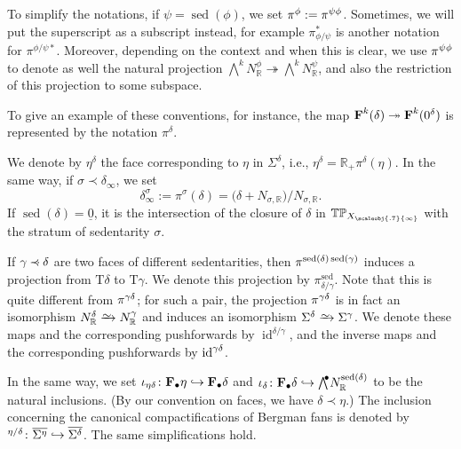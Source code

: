 \documentclass[11pt]{amsart}
\theoremstyle{definition}
\numberwithin{equation}{section}
\newcommand{\ie}{i.e.}
\renewcommand{\~}{\widetilde}
\newcommand{\R}{\mathbb{R}}
\newcommand{\simto}{\xrightarrow{\raisebox{-3pt}[0pt][0pt]{\small$\hspace{-1pt}\sim$}}}
\newcommand{\bul}{\bullet} %
\newcommand{\rquot}[2]{#1\big/#2}
\let\oldbigwedge\bigwedge
\renewcommand{\bigwedge}{{\textstyle\oldbigwedge\!}}
\DeclareMathOperator{\sed}{sed} %
\DeclareMathOperator{\id}{id} %
\newcommand{\TP}{\mathbb{TP}} %
\newcommand{\TT}{\mathrm{T}} %
\let\i\relax
\newcommand{\i}{{\mathop{}\mathrm{i}}} %
\newcommand{\SF}{\textrm{\bf F}} %
\newcommand{\comp}[1]{\overline{#1}} %
\newcommand{\sminfty}{{\scaleobj{.7}{\infty}}} %
\newcommand{\conezero}{{\underline0}} %
\newcommand{\subface}{\prec}
\newcommand{\ssubface}{\mathbin{\mathchoice
  {\subface\!\!\!\cdot}%
  {\subface\!\!\!\cdot}%
  {\subface\!\cdot}%
  {\subface\!\cdot}%
}} %
\begin{document}
{\medskip

To simplify the notations, if $\psi=\sed(\phi)$, we set $\pi^\phi:=\pi^{\psi\/\phi}$.
Sometimes, we will put the superscript as a subscript instead, for example $\pi_{\phi/\psi}^*$ is another notation for $\pi^{\phi/\psi *}$. Moreover, depending on the context and when this is clear, we use $\pi^{\psi\/\phi}$ to denote as well the natural projection $\bigwedge^k N^\phi_\R \twoheadrightarrow \bigwedge^k N^\psi_\R$, and also the restriction of this projection to some subspace.

To give an example of these conventions, for instance, the map $\SF^k(\delta) \twoheadrightarrow \SF^k(0^\delta)$ is represented by the notation $\pi^\delta$.

\medskip

We denote by $\eta^\delta$ the face corresponding to $\eta$ in $\Sigma^\delta$, \ie, $\eta^\delta=\R_+\pi^\delta(\eta)$. In the same way, if $\sigma \subface \delta_\infty$, we set
\[\delta_\infty^\sigma:=\pi^\sigma(\delta)=\rquot{\bigl(\delta + N_{\sigma,\R}\bigr)}{N_{\sigma,\R}}.
\]
If $\sed(\delta)=\conezero$, it is the intersection of the closure of $\delta$ in $\TP_{X_\sminfty}$ with the stratum of sedentarity $\sigma$.

\medskip

If $\gamma\ssubface\delta$ are two faces of different sedentarities, then $\pi^{\sed(\delta)\/\sed(\gamma)}$ induces a projection from $\TT\delta$ to $\TT\gamma$. We denote this projection by $\pi^{\sed}_{\delta/\gamma}$. Note that this is quite different from $\pi^{\gamma\/\delta}$; for such a pair, the projection $\pi^{\gamma\/\delta}$ is in fact an isomorphism $N^\delta_\R \simto N^\gamma_\R$ and induces an isomorphism $\Sigma^\delta \simto \Sigma^\gamma$. We denote these maps and the corresponding pushforwards by $\id^{\delta/\gamma}$, and the inverse maps and the corresponding pushforwards by $\id^{\gamma\/\delta}$.

\medskip

In the same way, we set $\iota_{\eta\/\delta}\colon \SF_\bul\eta \hookrightarrow \SF_\bul\delta$ and $\iota_{\delta}\colon \SF_\bul\delta \hookrightarrow \bigwedge^\bul N^{\sed(\delta)}_\R$ to be the natural inclusions. (By our convention on faces, we have $\delta\subface \eta$.) The inclusion concerning the canonical compactifications of Bergman fans is denoted by $\i^{\eta/\delta}\colon \comp{\Sigma^\eta} \hookrightarrow \comp{\Sigma^\delta}$. The same simplifications hold.

\medskip

}
\end{document}

